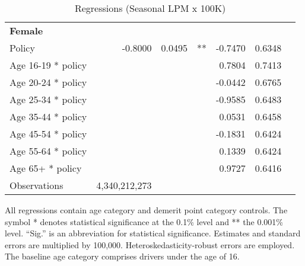 \begin{table}
\begin{tabular}{l r r l r r l}
\hline 

\textbf{Female} \\ 

Policy             &  -0.8000        &  0.0495       &   **       &  -0.7470        &  0.6348       &            \\ 
Age 16-19 * policy           & & &  &  0.7804        &  0.7413       &            \\ 
Age 20-24 * policy           & & &  &  -0.0442        &  0.6765       &            \\ 
Age 25-34 * policy           & & &  &  -0.9585        &  0.6483       &            \\ 
Age 35-44 * policy           & & &  &  0.0531        &  0.6458       &            \\ 
Age 45-54 * policy           & & &  &  -0.1831        &  0.6424       &            \\ 
Age 55-64 * policy           & & &  &  0.1339        &  0.6424       &            \\ 
Age 65+ * policy           & & &  &  0.9727        &  0.6416       &            \\ 
Observations & 4,340,212,273 \\ 


\hline 

\end{tabular} 
\caption{Regressions (Seasonal LPM x 100K)} 
All regressions contain age category and demerit point category controls. 
The symbol * denotes statistical significance at the 0.1\% level 
and ** the 0.001\% level. 
``Sig.'' is an abbreviation for statistical significance. 
Estimates and standard errors are multiplied by 100,000. 
Heteroskedasticity-robust errors are employed. 
The baseline age category comprises drivers under the age of 16. 
\label{tab:seas_LPMx100K_regs} 
\end{table} 
 

